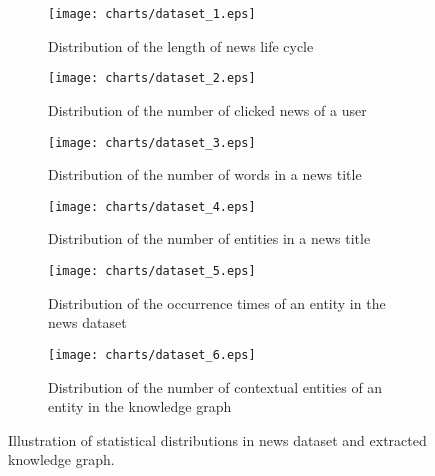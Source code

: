 \documentclass[sigconf]{acmart}
\begin{document}
		\begin{figure}
			\centering
            		\begin{subfigure}[b]{0.23\textwidth}
                		\texttt{[image: charts/dataset\_1.eps]}
                		\caption{Distribution of the length of news life cycle}
                		\label{fig:statistics_a}
            		\end{subfigure}
            		\hfill
            		\begin{subfigure}[b]{0.23\textwidth}
                		\texttt{[image: charts/dataset\_2.eps]}
                		\caption{Distribution of the number of clicked news of a user}
                		\label{fig:statistics_b}
            		\end{subfigure}
            		\hfill
            		\begin{subfigure}[b]{0.23\textwidth}
                		\texttt{[image: charts/dataset\_3.eps]}
                		\caption{Distribution of the number of words in a news title}
                		\label{fig:statistics_c}
            		\end{subfigure}
        		\hfill
            		\begin{subfigure}[b]{0.23\textwidth}
                		\texttt{[image: charts/dataset\_4.eps]}
                		\caption{Distribution of the number of entities in a news title}
                		\label{fig:statistics_d}
            		\end{subfigure}
            		\hfill
            		\begin{subfigure}[b]{0.23\textwidth}
                		\texttt{[image: charts/dataset\_5.eps]}
                		\caption{Distribution of the occurrence times of an entity in the news dataset}
                		\label{fig:statistics_e}
            		\end{subfigure}
            		\hfill
            		\begin{subfigure}[b]{0.23\textwidth}
                		\texttt{[image: charts/dataset\_6.eps]}
                		\caption{Distribution of the number of contextual entities of an entity in the knowledge graph}
                		\label{fig:statistics_f}
            		\end{subfigure}
            		\caption{Illustration of statistical distributions in news dataset and extracted knowledge graph.}
            		\label{fig:statistics}
        	\end{figure}
		
\end{document}
